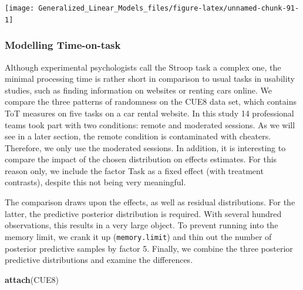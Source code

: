 \documentclass[]{svmono}
\newenvironment{Shaded}{\begin{snugshade}}{\end{snugshade}}
\newcommand{\KeywordTok}[1]{\textcolor[rgb]{0.13,0.29,0.53}{\textbf{#1}}}
\newcommand{\StringTok}[1]{\textcolor[rgb]{0.31,0.60,0.02}{#1}}
\newcommand{\OperatorTok}[1]{\textcolor[rgb]{0.81,0.36,0.00}{\textbf{#1}}}
\newcommand{\NormalTok}[1]{#1}
\begin{document}
\texttt{[image: Generalized\_Linear\_Models\_files/figure-latex/unnamed-chunk-91-1]}

\subsubsection{Modelling Time-on-task}\label{modelling-time-on-task}

Although experimental psychologists call the Stroop task a complex one,
the minimal processing time is rather short in comparison to usual tasks
in usability studies, such as finding information on websites or renting
cars online. We compare the three patterns of randomness on the CUE8
data set, which contains ToT measures on five tasks on a car rental
website. In this study 14 professional teams took part with two
conditions: remote and moderated sessions. As we will see in a later
section, the remote condition is contaminated with cheaters. Therefore,
we only use the moderated sessions. In addition, it is interesting to
compare the impact of the chosen distribution on effects estimates. For
this reason only, we include the factor Task as a fixed effect (with
treatment contrasts), despite this not being very meaningful.

The comparison draws upon the effects, as well as residual
distributions. For the latter, the predictive posterior distribution is
required. With several hundred observations, this results in a very
large object. To prevent running into the memory limit, we crank it up
(\texttt{memory.limit}) and thin out the number of posterior predictive
samples by factor 5. Finally, we combine the three posterior predictive
distributions and examine the differences.

\begin{Shaded}
\begin{Highlighting}[]
\KeywordTok{attach}\NormalTok{(CUE8)}
\end{Highlighting}
\end{Shaded}

\begin{Shaded}
\end{Shaded}
\end{document}
